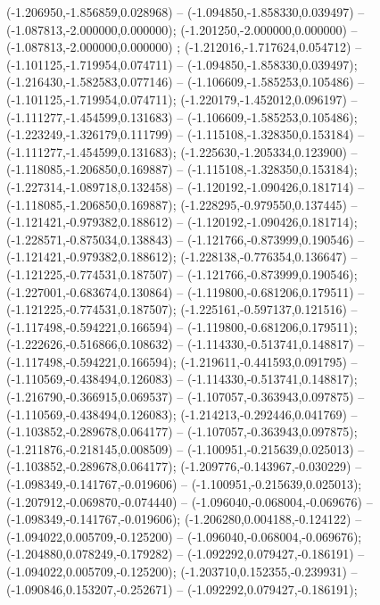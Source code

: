  (-1.206950,-1.856859,0.028968) -- (-1.094850,-1.858330,0.039497) -- (-1.087813,-2.000000,0.000000);
 (-1.201250,-2.000000,0.000000) -- (-1.087813,-2.000000,0.000000) ;
 (-1.212016,-1.717624,0.054712) -- (-1.101125,-1.719954,0.074711) -- (-1.094850,-1.858330,0.039497);
 (-1.216430,-1.582583,0.077146) -- (-1.106609,-1.585253,0.105486) -- (-1.101125,-1.719954,0.074711);
 (-1.220179,-1.452012,0.096197) -- (-1.111277,-1.454599,0.131683) -- (-1.106609,-1.585253,0.105486);
 (-1.223249,-1.326179,0.111799) -- (-1.115108,-1.328350,0.153184) -- (-1.111277,-1.454599,0.131683);
 (-1.225630,-1.205334,0.123900) -- (-1.118085,-1.206850,0.169887) -- (-1.115108,-1.328350,0.153184);
 (-1.227314,-1.089718,0.132458) -- (-1.120192,-1.090426,0.181714) -- (-1.118085,-1.206850,0.169887);
 (-1.228295,-0.979550,0.137445) -- (-1.121421,-0.979382,0.188612) -- (-1.120192,-1.090426,0.181714);
 (-1.228571,-0.875034,0.138843) -- (-1.121766,-0.873999,0.190546) -- (-1.121421,-0.979382,0.188612);
 (-1.228138,-0.776354,0.136647) -- (-1.121225,-0.774531,0.187507) -- (-1.121766,-0.873999,0.190546);
 (-1.227001,-0.683674,0.130864) -- (-1.119800,-0.681206,0.179511) -- (-1.121225,-0.774531,0.187507);
 (-1.225161,-0.597137,0.121516) -- (-1.117498,-0.594221,0.166594) -- (-1.119800,-0.681206,0.179511);
 (-1.222626,-0.516866,0.108632) -- (-1.114330,-0.513741,0.148817) -- (-1.117498,-0.594221,0.166594);
 (-1.219611,-0.441593,0.091795) -- (-1.110569,-0.438494,0.126083) -- (-1.114330,-0.513741,0.148817);
 (-1.216790,-0.366915,0.069537) -- (-1.107057,-0.363943,0.097875) -- (-1.110569,-0.438494,0.126083);
 (-1.214213,-0.292446,0.041769) -- (-1.103852,-0.289678,0.064177) -- (-1.107057,-0.363943,0.097875);
 (-1.211876,-0.218145,0.008509) -- (-1.100951,-0.215639,0.025013) -- (-1.103852,-0.289678,0.064177);
 (-1.209776,-0.143967,-0.030229) -- (-1.098349,-0.141767,-0.019606) -- (-1.100951,-0.215639,0.025013);
 (-1.207912,-0.069870,-0.074440) -- (-1.096040,-0.068004,-0.069676) -- (-1.098349,-0.141767,-0.019606);
 (-1.206280,0.004188,-0.124122) -- (-1.094022,0.005709,-0.125200) -- (-1.096040,-0.068004,-0.069676);
 (-1.204880,0.078249,-0.179282) -- (-1.092292,0.079427,-0.186191) -- (-1.094022,0.005709,-0.125200);
 (-1.203710,0.152355,-0.239931) -- (-1.090846,0.153207,-0.252671) -- (-1.092292,0.079427,-0.186191);
